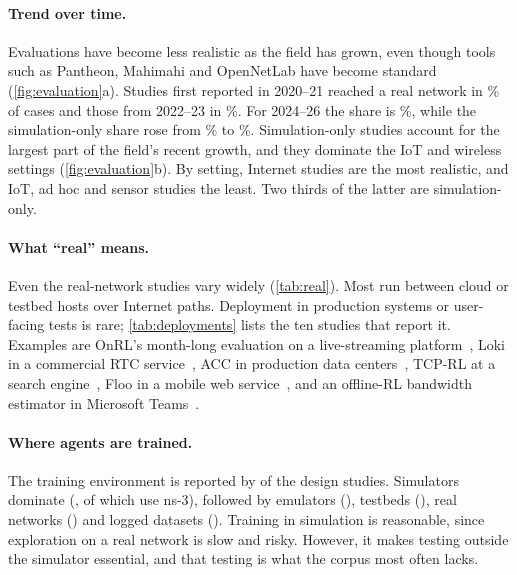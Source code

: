\paragraph{Trend over time.} Evaluations have become less realistic as the field has grown, even though tools such as Pantheon, Mahimahi and OpenNetLab have become standard (\cref{fig:evaluation}a). Studies first reported in 2020--21 reached a real network in \nPeriodBReal\% of cases and those from 2022--23 in \nPeriodCReal\%. For 2024--26 the share is \nPeriodDReal\%, while the simulation-only share rose from \nPeriodBSim\% to \nPeriodDSim\%. Simulation-only studies account for the largest part of the field's recent growth, and they dominate the IoT and wireless settings (\cref{fig:evaluation}b). By setting, Internet studies are the most realistic, and IoT, ad hoc and sensor studies the least. Two thirds of the latter are simulation-only.


\paragraph{What ``real'' means.} Even the \nLevelRealnetwork{} real-network studies vary widely (\cref{tab:real}). Most run between cloud or testbed hosts over Internet paths. Deployment in production systems or user-facing tests is rare; \cref{tab:deployments} lists the ten studies that report it. Examples are OnRL's month-long evaluation on a live-streaming platform~\cite{zhang2020onrl}, Loki in a commercial RTC service~\cite{zhang2021loki}, ACC in production data centers~\cite{yan2021acc}, TCP-RL at a search engine~\cite{nie2019tcprl}, Floo in a mobile web service~\cite{zhang2023floo}, and an offline-RL bandwidth estimator in Microsoft Teams~\cite{khairy2026human}.

\paragraph{Where agents are trained.} The training environment is reported by \nTrainReported{} of the \nDesignN{} design studies. Simulators dominate (\nTrainSim, of which \nTrainNsThree{} use ns-3), followed by emulators (\nTrainEmu), testbeds (\nTrainTestbed), real networks (\nTrainReal) and logged datasets (\nTrainData). Training in simulation is reasonable, since exploration on a real network is slow and risky. However, it makes testing outside the simulator essential, and that testing is what the corpus most often lacks.

